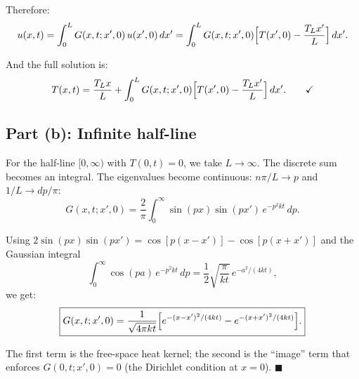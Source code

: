 \documentclass[12pt]{article}
\begin{document}
Therefore:
\[
u(x,t) = \int_0^L G(x,t;x',0)\,u(x',0)\,dx' = \int_0^L G(x,t;x',0)\Bigl[T(x',0) - \frac{T_L x'}{L}\Bigr]\,dx'.
\]

And the full solution is:
\[
T(x,t) = \frac{T_L x}{L} + \int_0^L G(x,t;x',0)\Bigl[T(x',0) - \frac{T_L x'}{L}\Bigr]\,dx'. \qquad \checkmark
\]

\subsection*{Part (b): Infinite half-line}

For the half-line $[0,\infty)$ with $T(0,t) = 0$, we take $L \to \infty$. The discrete sum becomes an integral. The eigenvalues become continuous: $n\pi/L \to p$ and $1/L \to dp/\pi$:
\[
G(x,t;x',0) = \frac{2}{\pi}\int_0^{\infty}\sin(px)\sin(px')\,e^{-p^2 kt}\,dp.
\]

Using $2\sin(px)\sin(px') = \cos[p(x-x')] - \cos[p(x+x')]$ and the Gaussian integral
\[
\int_0^{\infty}\cos(pa)\,e^{-p^2 kt}\,dp = \frac{1}{2}\sqrt{\frac{\pi}{kt}}\,e^{-a^2/(4kt)},
\]
we get:
\[
\boxed{G(x,t;x',0) = \frac{1}{\sqrt{4\pi kt}}\Bigl[e^{-(x-x')^2/(4kt)} - e^{-(x+x')^2/(4kt)}\Bigr].}
\]

The first term is the free-space heat kernel; the second is the ``image'' term that enforces $G(0,t;x',0) = 0$ (the Dirichlet condition at $x=0$). $\blacksquare$
\end{document}
